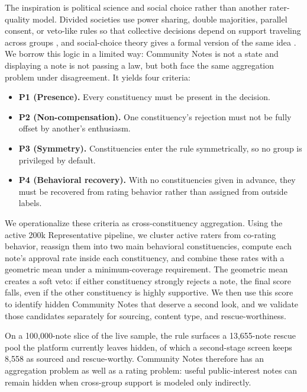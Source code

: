 \documentclass[10pt,twocolumn]{article}
\begin{document}
The inspiration is political science and social choice rather than another
rater-quality model. Divided societies use power sharing, double majorities,
parallel consent, or veto-like rules so that collective decisions depend on
support traveling across groups
\citep{lijphart1977democracy,mcgarryoleary2009,horowitz1991makingmoderation,reilly2002electoral},
and social-choice theory gives a formal version of the same idea
\citep{peters2019proportionality,qiu2025representative}. We borrow this logic in
a limited way: Community Notes is not a state and displaying a note is not
passing a law, but both face the same aggregation problem under disagreement. It
yields four criteria:
\begin{itemize}[leftmargin=*,itemsep=2pt,topsep=3pt]
    \item \textbf{P1 (Presence).} Every constituency must be present in the
    decision.
    \item \textbf{P2 (Non-compensation).} One constituency's rejection must not
    be fully offset by another's enthusiasm.
    \item \textbf{P3 (Symmetry).} Constituencies enter the rule symmetrically,
    so no group is privileged by default.
    \item \textbf{P4 (Behavioral recovery).} With no constituencies given in
    advance, they must be recovered from rating behavior rather than assigned
    from outside labels.
\end{itemize}

We operationalize these criteria as cross-constituency aggregation. Using the
active 200k Representative pipeline, we cluster active raters from co-rating
behavior, reassign them into two main behavioral constituencies, compute each
note's approval rate inside each constituency, and combine these rates with a
geometric mean under a minimum-coverage requirement. The geometric mean creates a
soft veto: if either constituency strongly rejects a note, the final score falls,
even if the other constituency is highly supportive. We then use this score to
identify hidden Community Notes that deserve a second look, and we validate those
candidates separately for sourcing, content type, and rescue-worthiness.

On a 100,000-note slice of the live sample, the rule surfaces a 13,655-note
rescue pool the platform currently leaves hidden, of which a second-stage screen
keeps 8,558 as sourced and rescue-worthy. Community Notes therefore has an
aggregation problem as well as a rating problem: useful public-interest notes
can remain hidden when cross-group support is modeled only indirectly.
\end{document}
